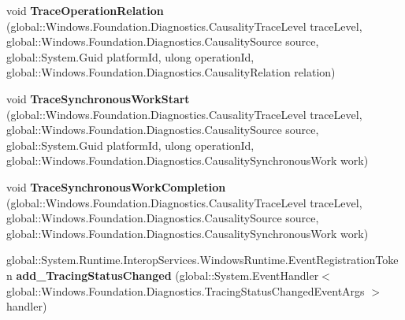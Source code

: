 \begin{DoxyCompactItemize}
\item 
\mbox{\label{interface_windows_1_1_foundation_1_1_diagnostics_1_1_i_async_causality_tracer_statics_ad69dacbb1c6dd0ede745f227c69d8d16}} 
void {\bfseries Trace\+Operation\+Relation} (global\+::\+Windows.\+Foundation.\+Diagnostics.\+Causality\+Trace\+Level trace\+Level, global\+::\+Windows.\+Foundation.\+Diagnostics.\+Causality\+Source source, global\+::\+System.\+Guid platform\+Id, ulong operation\+Id, global\+::\+Windows.\+Foundation.\+Diagnostics.\+Causality\+Relation relation)
\item 
\mbox{\label{interface_windows_1_1_foundation_1_1_diagnostics_1_1_i_async_causality_tracer_statics_a749785813f9caf99b9ac0f4fd89700a2}} 
void {\bfseries Trace\+Synchronous\+Work\+Start} (global\+::\+Windows.\+Foundation.\+Diagnostics.\+Causality\+Trace\+Level trace\+Level, global\+::\+Windows.\+Foundation.\+Diagnostics.\+Causality\+Source source, global\+::\+System.\+Guid platform\+Id, ulong operation\+Id, global\+::\+Windows.\+Foundation.\+Diagnostics.\+Causality\+Synchronous\+Work work)
\item 
\mbox{\label{interface_windows_1_1_foundation_1_1_diagnostics_1_1_i_async_causality_tracer_statics_a1543ef1de5733e88b1cf2a3424c199f5}} 
void {\bfseries Trace\+Synchronous\+Work\+Completion} (global\+::\+Windows.\+Foundation.\+Diagnostics.\+Causality\+Trace\+Level trace\+Level, global\+::\+Windows.\+Foundation.\+Diagnostics.\+Causality\+Source source, global\+::\+Windows.\+Foundation.\+Diagnostics.\+Causality\+Synchronous\+Work work)
\item 
\mbox{\label{interface_windows_1_1_foundation_1_1_diagnostics_1_1_i_async_causality_tracer_statics_adecd1f58d29fb341c2489d08610ac331}} 
global\+::\+System.\+Runtime.\+Interop\+Services.\+Windows\+Runtime.\+Event\+Registration\+Token {\bfseries add\+\_\+\+Tracing\+Status\+Changed} (global\+::\+System.\+Event\+Handler$<$ global\+::\+Windows.\+Foundation.\+Diagnostics.\+Tracing\+Status\+Changed\+Event\+Args $>$ handler)
\item 

\end{DoxyCompactItemize}
